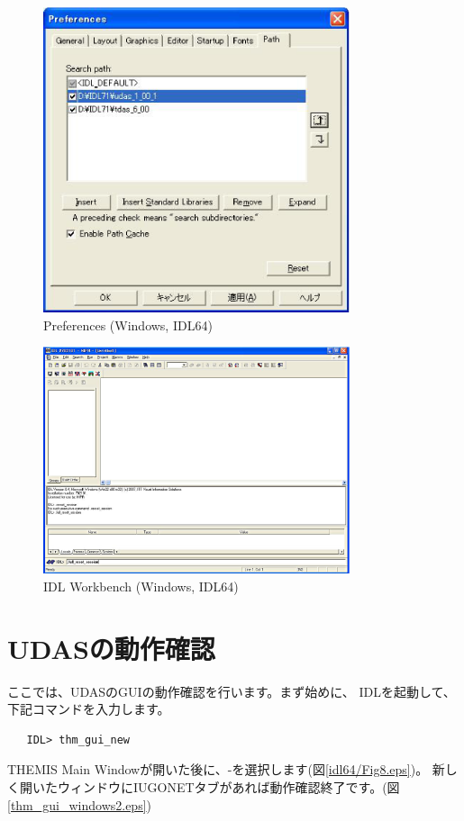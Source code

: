 \documentclass[a4j]{jbook}
\begin{document}
\begin{figure}[H]
\begin{center}
\includegraphics[width=9cm]{images/fig_idl64/Fig5.eps}
\caption{Preferences (Windows, IDL64)}
\label{idl64/Fig5.eps}
\end{center}
\end{figure}

\begin{figure}[H]
\begin{center}
\includegraphics[width=9cm]{images/fig_idl64/Fig6.eps}
\caption{IDL Workbench (Windows, IDL64)}
\label{idl64/Fig6.eps}
\end{center}
\end{figure}

\section{UDASの動作確認}
ここでは、UDASのGUIの動作確認を行います。まず始めに、
IDLを起動して、下記コマンドを入力します。
\begin{screen}
\begin{verbatim}
   IDL> thm_gui_new
\end{verbatim}
\end{screen}
THEMIS Main Windowが開いた後に、-を選択します(図\ref{idl64/Fig8.eps})。
新しく開いたウィンドウにIUGONETタブがあれば動作確認終了です。(図\ref{thm_gui_windows2.eps})
\end{document}
